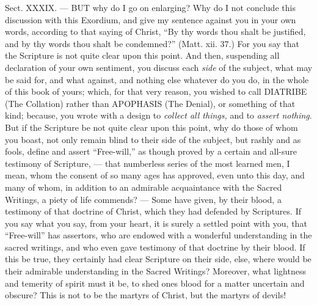 Sect. XXXIX. — BUT why do I go on enlarging? Why do I not conclude this discussion with this Exordium, and give my sentence against you in your own words, according to that saying of Christ, “By thy words thou shalt be justified, and by thy words thou shalt be condemned?” (Matt. xii. 37.) For you say that the Scripture is not quite clear upon this point. And then, suspending all declaration of your own sentiment, you discuss each \emph{side }of the subject, what may be said for, and what against, and nothing else whatever do you do, in the whole of this book of yours; which, for that very reason, you wished to call \textsc{DIATRIBE} (The Collation) rather than \textsc{APOPHASIS} (The Denial), or something of that kind; because, you wrote with a design to \emph{collect all things, }and to \emph{assert nothing}. But if the Scripture be not quite clear upon this point, why do those of whom you boast, not only remain blind to their side of the subject, but rashly and as fools, define and assert “Free-will,” as though proved by a certain and all-sure testimony of Scripture, — that numberless series of the most learned men, I mean, whom the consent of so many ages has approved, even unto this day, and many of whom, in addition to an admirable acquaintance with the Sacred Writings, a piety of life commends? — Some have given, by their blood, a testimony of that doctrine of Christ, which they had defended by Scriptures. If you say what you say, from your heart, it is surely a settled point with you, that “Free-will” has assertors, who are endowed with a wonderful understanding in the sacred writings, and who even gave testimony of that doctrine by their blood. If this be true, they certainly had clear Scripture on their side, else, where would be their admirable understanding in the Sacred Writings? Moreover, what lightness and temerity of spirit must it be, to shed ones blood for a matter uncertain and obscure? This is not to be the martyrs of Christ, but the martyrs of devils!

